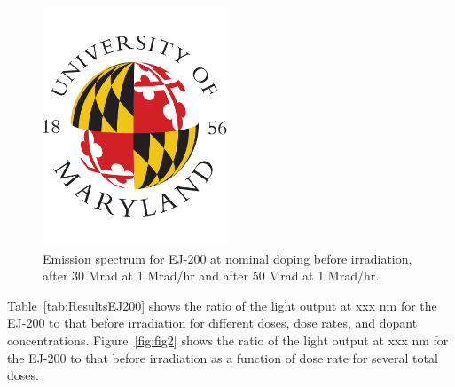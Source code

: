 \documentclass[review]{elsarticle}
\begin{document}
\begin{figure}[!ht]
\begin{center}
\includegraphics[width=0.49\textwidth]{./figures/placeholder.pdf}
\caption{
Emission spectrum for EJ-200 at nominal doping before irradiation, after 30 Mrad at 1 Mrad/hr and after 50 Mrad at 1 Mrad/hr.
}
\label{fig:ej200doping1x}
\end{center}
\end{figure}



Table~\ref{tab:ResultsEJ200} shows the ratio of the light output
at {\color{red} xxx nm}
for the EJ-200  to that before irradiation for different doses, dose rates, and dopant concentrations.
Figure~\ref{fig:fig2} shows the ratio of the light output
at {\color{red} xxx nm}
for the EJ-200 to that before irradiation as a function of dose rate
for several total doses.
\end{document}
